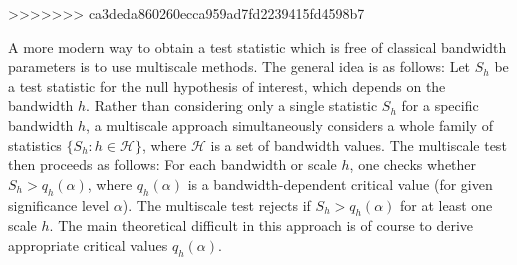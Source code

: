 \documentclass[a4paper,12pt]{article}
\begin{document}
\begin{itemize}[label=--,leftmargin=0.5cm]
>>>>>>> ca3deda860260ecca959ad7fd2239415fd4598b7


A more modern way to obtain a test statistic which is free of classical bandwidth parameters is to use multiscale methods. The general idea is as follows: Let $S_h$ be a test statistic for the null hypothesis of interest, which depends on the bandwidth $h$. Rather than considering only a single statistic $S_h$ for a specific bandwidth $h$, a multiscale approach simultaneously considers a whole family of statistics $\{S_h: h \in \mathcal{H} \}$, where $\mathcal{H}$ is a set of bandwidth values. The multiscale test then proceeds as follows: For each bandwidth or scale $h$, one checks whether $S_h > q_h(\alpha)$, where $q_h(\alpha)$ is a bandwidth-dependent critical value (for given significance level $\alpha$). The multiscale test rejects if $S_h > q_h(\alpha)$ for at least one scale $h$. The main theoretical difficult in this approach is of course to derive appropriate critical values $q_h(\alpha)$. 



\end{itemize}
\end{document}
